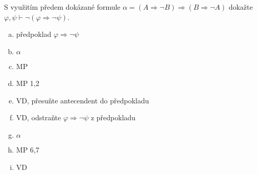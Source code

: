\subsubsection{}
S využitím předem dokázané formule $\alpha = (A \Rightarrow \neg B) \Rightarrow (B \Rightarrow \neg A)$ dokažte $\varphi, \psi \vdash \neg(\varphi \Rightarrow \neg \psi)$.
\begin{enumerate}[a)]
	\item předpoklad $\varphi \Rightarrow \neg \psi$
	\item $\alpha$
	\item MP
	\item MP 1,2
	\item VD, přesuňte antecendent do předpokladu
	\item VD, odstraňte $\varphi \Rightarrow \neg \psi$ z předpokladu
	\item $\alpha$
	\item MP 6,7
	\item VD
\end{enumerate}
